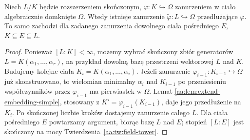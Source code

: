 \begin{wniosek}
\label{aa:wn:extend-embedding-finite}
Niech $L/K$ będzie rozszerzeniem skończonym,
$\varphi:K\hookrightarrow\Omega$ zanurzeniem w ciało
algebraicznie domknięte $\Omega$. Wtedy istnieje zanurzenie
$\widetilde\varphi:L\hookrightarrow\Omega$ przedłużające
$\varphi$. To samo zachodzi dla zadanego zanurzenia dowolnego
ciała pośredniego $E$, $K\subseteq E\subseteq L$.
\end{wniosek}
\begin{proof}
Ponieważ $[L:K]<\infty$, możemy wybrać skończony zbiór
generatorów $L=K(\alpha_1,\ldots,\alpha_r)$, na przykład
dowolną bazę przestrzeni wektorowej $L$ nad $K$.
Budujemy kolejne ciała $K_i=K(\alpha_1,\ldots,\alpha_i)$.
Jeżeli zanurzenie $\varphi_{i-1}:K_{i-1}\hookrightarrow\Omega$
już skonstruowano, to wielomian minimalny $\alpha_i$
nad $K_{i-1}$ po przeniesieniu współczynników przez
$\varphi_{i-1}$ ma pierwiastek w $\Omega$. Lemat
\ref{aa:lem:extend-embedding-simple}, stosowany z
$K'=\varphi_{i-1}(K_{i-1})$, daje jego przedłużenie
na $K_i$. Po skończonej liczbie kroków dostajemy
zanurzenie całego $L$. Dla ciała pośredniego $E$
powtarzamy argument, biorąc bazę $L$ nad $E$;
stopień $[L:E]$ jest skończony na mocy
Twierdzenia~\ref{aa:tw:field-tower}.
\end{proof}

